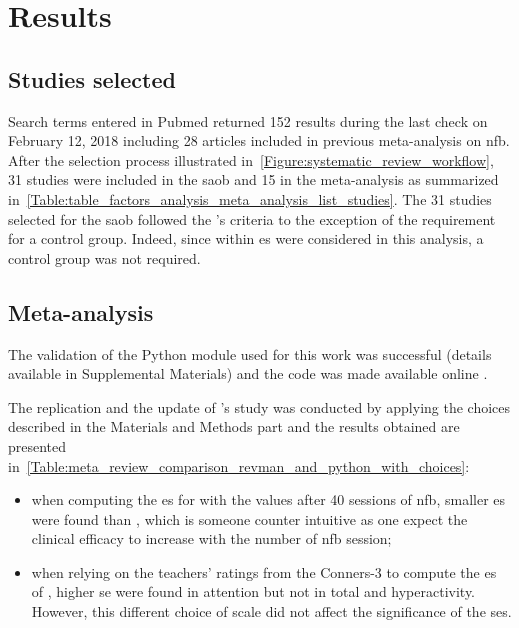 


\section{Results}

\subsection{Studies selected}

Search terms entered in Pubmed returned 152 results during the last check on February 12, 2018 including 28 
articles included in previous meta-analysis on \gls{nfb}. After the selection process illustrated 
in~\ref{Figure:systematic_review_workflow}, 31 studies were included in the \gls{saob} and 15 in the meta-analysis 
as summarized in~\ref{Table:table_factors_analysis_meta_analysis_list_studies}. The 31 studies selected for the \gls{saob} 
followed the \citeauthor{Cortese2016}'s criteria to the exception of the requirement for a control group. 
Indeed, since within \gls{es} were considered in this analysis, a control group was not required.

\subsection{Meta-analysis}

The validation of the Python module used for this work was successful (details available in Supplemental Materials) 
and the code was made available online \citep{Bussalb2018}.

The replication and the update of \citeauthor{Cortese2016}'s study was conducted by applying the choices described 
in the Materials and Methods part and the results obtained are presented 
in~\ref{Table:meta_review_comparison_revman_and_python_with_choices}:

\begin{itemize}
    \item when computing the \gls{es} for \citet{Arnold2014} with the values after 40 sessions of \gls{nfb}, 
      smaller \gls{es} were found than \citet{Cortese2016}, which is someone counter intuitive as one expect 
			the clinical efficacy to increase with the number of \gls{nfb} session;  
    \item when relying on the teachers' ratings from the Conners-3 to compute the \gls{es} of \citet{Steiner2014}, 
		higher \gls{se} were found in attention but not in total and hyperactivity. However, this different choice of 
		scale did not affect the significance of the \glspl{se}.
\end{itemize}

